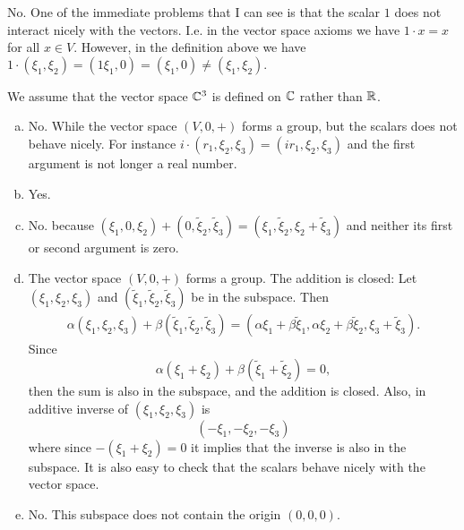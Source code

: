 \begin{problem}
	\begin{solution}
		No. One of the immediate problems that I can see is that the scalar $ 1 $ does not interact nicely with the vectors. I.e. in the vector space axioms we have $ 1\cdot x = x $ for all $ x\in V $. However, in the definition above we have $ 1\cdot(\xi_1,\xi_2) = (1\xi_1,0) = (\xi_1,0) \neq (\xi_1,\xi_2).    $
	\end{solution}
\end{problem}

\begin{problem}
	\begin{solution}
		We assume that the vector space $ \mathbb{C}^3 $ is defined on $ \mathbb{C} $ rather than $ \mathbb{R} $.
		\begin{enumerate}[(a)]
			\item No. While the vector space $ (V,0,+) $ forms a group, but the scalars does not behave nicely. For instance $ i\cdot(r_1,\xi_2,\xi_3) = (ir_1,\xi_2,\xi_3)  $ and the first argument is not longer a real number.
			\item Yes.
			\item No. because $ (\xi_1,0,\xi_2) + (0,\tilde\xi_2,\tilde\xi_3) = (\xi_1,\tilde\xi_2,\xi_2+\tilde\xi_3) $ and neither its first or second argument is zero.
			\item The vector space $ (V,0,+) $ forms a group. The addition is closed: Let $ (\xi_1,\xi_2,\xi_3) $ and $ (\tilde\xi_1,\tilde\xi_2,\tilde\xi_3) $ be in the subspace. Then 
			\begin{align*}
				\alpha (\xi_1,\xi_2,\xi_3) + \beta(\tilde\xi_1,\tilde\xi_2,\tilde\xi_3) = (\alpha\xi_1+\beta\tilde\xi_1,\alpha\xi_2+\beta\tilde\xi_2,\xi_3+\tilde\xi_3).
			\end{align*}
			Since
			\[ \alpha(\xi_1 + \xi_2) + \beta (\tilde\xi_1 + \tilde\xi_2) = 0, \]
			then the sum is also in the subspace, and the addition is closed. Also, in additive inverse of $ (\xi_1,\xi_2,\xi_3) $ is
			\[ (-\xi_1,-\xi_2,-\xi_3) \]
			where since $ -(\xi_1+\xi_2) = 0 $ it implies that the inverse is also in the subspace. It is also easy to check that the scalars behave nicely with the vector space.
			\item No. This subspace does not contain the origin $ (0,0,0) $.
		\end{enumerate}
	\end{solution}
\end{problem}

